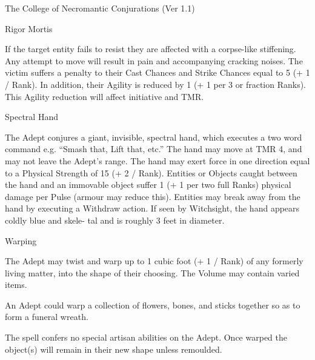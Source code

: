 \begin{Chapter}{The College of Necromantic Conjurations (Ver 1.1)}
\begin{spell}[G-9]{Rigor Mortis}
\begin{effects}
If the target entity fails to resist they are affected with a
corpse-like stiffening. Any attempt to move will result in pain and
accompanying cracking noises.  The victim suffers a penalty to their
Cast Chances and Strike Chances equal to 5 (+ 1 / Rank).  In addition,
their Agility is reduced by 1 (+ 1 per 3 or fraction Ranks).  This
Agility reduction will affect initiative and TMR.
\end{effects}
\end{spell}

\begin{spell}[G-10]{Spectral Hand}
\begin{effects}
The Adept conjures a giant, invisible, spectral hand, which executes a
two word command e.g.  “Smash that, Lift that, etc.”  The hand may
move at TMR 4, and may not leave the Adept’s range.  The hand may
exert force in one direction equal to a Physical Strength of 15 (+ 2 /
Rank). Entities or Objects caught between the hand and an immovable
object suffer 1 (+ 1 per two full Ranks) physical damage per Pulse
(armour may reduce this).  Entities may break away from the hand by
executing a Withdraw action.  If seen by Witchsight, the hand appears
coldly blue and skele- tal and is roughly 3 feet in diameter.
\end{effects}
\end{spell}

\begin{spell}[G-11]{Warping}
\begin{effects}
The Adept may twist and warp up to 1 cubic foot (+ 1 / Rank) of any
formerly living matter, into the shape of their choosing.  The Volume
may contain varied items.

\begin{example} 
An Adept could warp a collection of flowers, bones, and sticks
together so as to form a funeral wreath.
\end{example}

The spell confers no special artisan abilities on the Adept.  Once
warped the object(s) will remain in their new shape unless remoulded.
\end{effects}
\end{spell}


\end{Chapter}
